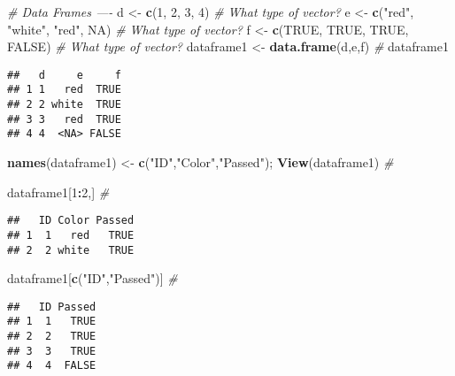 \documentclass[]{article}
\newenvironment{Shaded}{\begin{snugshade}}{\end{snugshade}}
\newcommand{\CommentTok}[1]{\textcolor[rgb]{0.56,0.35,0.01}{\textit{#1}}}
\newcommand{\DecValTok}[1]{\textcolor[rgb]{0.00,0.00,0.81}{#1}}
\newcommand{\KeywordTok}[1]{\textcolor[rgb]{0.13,0.29,0.53}{\textbf{#1}}}
\newcommand{\NormalTok}[1]{#1}
\newcommand{\OperatorTok}[1]{\textcolor[rgb]{0.81,0.36,0.00}{\textbf{#1}}}
\newcommand{\OtherTok}[1]{\textcolor[rgb]{0.56,0.35,0.01}{#1}}
\newcommand{\StringTok}[1]{\textcolor[rgb]{0.31,0.60,0.02}{#1}}
\begin{document}
\begin{Shaded}
\begin{Highlighting}[]
\CommentTok{# Data Frames ----}
\NormalTok{d <-}\StringTok{ }\KeywordTok{c}\NormalTok{(}\DecValTok{1}\NormalTok{, }\DecValTok{2}\NormalTok{, }\DecValTok{3}\NormalTok{, }\DecValTok{4}\NormalTok{) }\CommentTok{# What type of vector?}
\NormalTok{e <-}\StringTok{ }\KeywordTok{c}\NormalTok{(}\StringTok{"red"}\NormalTok{, }\StringTok{"white"}\NormalTok{, }\StringTok{"red"}\NormalTok{, }\OtherTok{NA}\NormalTok{) }\CommentTok{# What type of vector?}
\NormalTok{f <-}\StringTok{ }\KeywordTok{c}\NormalTok{(}\OtherTok{TRUE}\NormalTok{, }\OtherTok{TRUE}\NormalTok{, }\OtherTok{TRUE}\NormalTok{, }\OtherTok{FALSE}\NormalTok{) }\CommentTok{# What type of vector?}
\NormalTok{dataframe1 <-}\StringTok{ }\KeywordTok{data.frame}\NormalTok{(d,e,f) }\CommentTok{#}
\NormalTok{dataframe1}
\end{Highlighting}
\end{Shaded}

\begin{verbatim}
##   d     e     f
## 1 1   red  TRUE
## 2 2 white  TRUE
## 3 3   red  TRUE
## 4 4  <NA> FALSE
\end{verbatim}

\begin{Shaded}
\begin{Highlighting}[]
\KeywordTok{names}\NormalTok{(dataframe1) <-}\StringTok{ }\KeywordTok{c}\NormalTok{(}\StringTok{"ID"}\NormalTok{,}\StringTok{"Color"}\NormalTok{,}\StringTok{"Passed"}\NormalTok{); }\KeywordTok{View}\NormalTok{(dataframe1) }\CommentTok{# }

\NormalTok{dataframe1[}\DecValTok{1}\OperatorTok{:}\DecValTok{2}\NormalTok{,] }\CommentTok{# }
\end{Highlighting}
\end{Shaded}

\begin{verbatim}
##   ID Color Passed
## 1  1   red   TRUE
## 2  2 white   TRUE
\end{verbatim}

\begin{Shaded}
\begin{Highlighting}[]
\NormalTok{dataframe1[}\KeywordTok{c}\NormalTok{(}\StringTok{"ID"}\NormalTok{,}\StringTok{"Passed"}\NormalTok{)] }\CommentTok{# }
\end{Highlighting}
\end{Shaded}

\begin{verbatim}
##   ID Passed
## 1  1   TRUE
## 2  2   TRUE
## 3  3   TRUE
## 4  4  FALSE
\end{verbatim}
\end{document}
